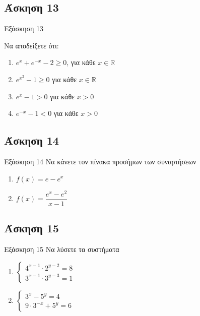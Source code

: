 \documentclass[greek]{beamer}
\begin{document}
\subsection{Άσκηση 13}
\begin{frame}[label=Άσκηση13,t]{Εξάσκηση 13}

 Να αποδείξετε ότι:
 \begin{enumerate}
  \item<1-> $e^x+e^{-x}-2\ge 0$, για κάθε $x\in \mathbb{R}$
  \item<2-> $e^{x^2}-1\ge 0$ για κάθε $x\in\mathbb{R}$
  \item<3-> $e^x-1>0$ για κάθε $x>0$
  \item<4-> $e^{-x}-1<0$ για κάθε $x>0$
 \end{enumerate}

\end{frame}

\subsection{Άσκηση 14}
\begin{frame}[label=Άσκηση14,t]{Εξάσκηση 14}
 Να κάνετε τον πίνακα προσήμων των συναρτήσεων
 \begin{enumerate}
  \item<1-> $f(x)=e-e^x$
  \item<2-> $f(x)=\dfrac{e^x-e^2}{x-1}$
 \end{enumerate}

\end{frame}

\subsection{Άσκηση 15}
\begin{frame}[label=Άσκηση15,t]{Εξάσκηση 15}
 Να λύσετε τα συστήματα
 \begin{enumerate}
  \item<1-> $\begin{cases}
     4^{x-1}\cdot 2^{y-2}=8 \\
     3^{x-1}\cdot 3^{y-3}=1
    \end{cases}$
  \item<2-> $\begin{cases}
     3^{x}- 5^{y}=4 \\
     9\cdot 3^{-x}+ 5^{y}=6
    \end{cases}$
 \end{enumerate}

\end{frame}
\end{document}
